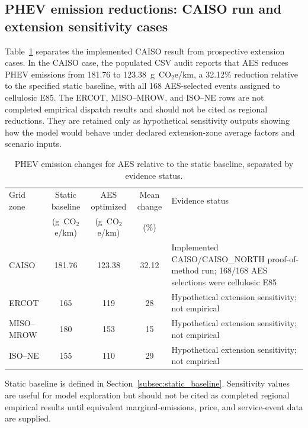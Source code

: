 \documentclass[cleantechnol,article,submit,pdftex,moreauthors]{Definitions/mdpi}
\newcommand{\gcoeqkm}{g~CO$_2$e/km}
\begin{document}


\subsection{PHEV emission reductions: CAISO run and extension sensitivity cases}
\label{subsec:phev_reductions}

Table~\ref{tab:regional_reductions} separates the implemented CAISO result from prospective extension cases. In the CAISO case, the populated CSV audit reports that AES reduces PHEV emissions from 181.76 to 123.38~\gcoeqkm{}, a 32.12\% reduction relative to the specified static baseline, with all 168 AES-selected events assigned to cellulosic E85. The ERCOT, MISO--MROW, and ISO--NE rows are not completed empirical dispatch results and should not be cited as regional reductions. They are retained only as hypothetical sensitivity outputs showing how the model would behave under declared extension-zone average factors and scenario inputs.

\begin{table}[htbp]
	\centering
	\begin{threeparttable}
		\caption{PHEV emission changes for AES relative to the static baseline, separated by evidence status.}
		\label{tab:regional_reductions}
		\scriptsize
		\begin{tabular}{lcccl}
			\toprule
			Grid zone & Static baseline & AES optimized & Mean change & Evidence status \\
			& (\gcoeqkm{}) & (\gcoeqkm{}) & (\%) & \\
			\midrule
			CAISO & 181.76 & 123.38 & 32.12 & Implemented CAISO/CAISO\_NORTH proof-of-method run; 168/168 AES selections were cellulosic E85 \\
			ERCOT & 165 & 119 & 28 & Hypothetical extension sensitivity; not empirical \\
			MISO--MROW & 180 & 153 & 15 & Hypothetical extension sensitivity; not empirical \\
			ISO--NE & 155 & 110 & 29 & Hypothetical extension sensitivity; not empirical \\
			\bottomrule
		\end{tabular}
		\begin{tablenotes}
			\footnotesize
			\item Static baseline is defined in Section~\ref{subsec:static_baseline}. Sensitivity values are useful for model exploration but should not be cited as completed regional empirical results until equivalent marginal-emissions, price, and service-event data are supplied.
		\end{tablenotes}
	\end{threeparttable}
\end{table}
\end{document}
